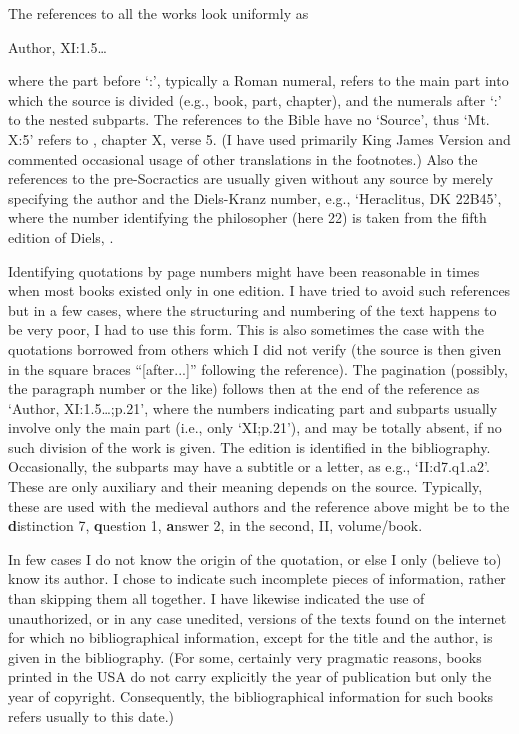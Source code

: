 The references to all the works look uniformly as
\begin{center}
  Author,  XI:1.5\ldots
\end{center}  
where the part before `:', typically a Roman numeral, refers to the main part
into which the source is divided (e.g., book, part, chapter), and the numerals
after `:' to the nested subparts.  The references to the Bible have no `Source',
thus `Mt. X:5' refers to , chapter X, verse 5. 
(I have used primarily King James Version and commented occasional usage of
other translations in the footnotes.) 
Also the references to the pre-Socractics are usually given without any source by
merely specifying the author and the Diels-Kranz number, e.g., `Heraclitus, DK
22B45', where the number identifying the philosopher (here 22) is taken from the
fifth edition of Diels, .

Identifying quotations by page numbers might have been reasonable in times when
most books existed only in one edition.  I have tried to avoid such references
but in a few cases, where the structuring and numbering of the text happens to
be very poor, I had to use this form. This is also sometimes the case with the
quotations borrowed from others which I did not verify (the source is then given
in the square braces ``[after...]'' following the reference).  The pagination
(possibly, the paragraph number or the like) 
follows then at the end of the reference as `Author, 
XI:1.5\ldots;p.21', where the numbers indicating part and subparts usually
involve only the main part (i.e., only `XI;p.21'), and may be totally absent, if
no such division of the work is given.  The edition is identified in the
bibliography.  Occasionally, the subparts may have a subtitle or a letter, as e.g.,
`II:d7.q1.a2'. These are only auxiliary and their meaning depends on the source.
Typically, these are used with the medieval authors and the reference above
might be to the {\bf d}istinction 7, {\bf q}uestion 1, {\bf a}nswer 2, in the
second, II, volume/book.

In few cases I do not know the origin of the quotation, or else I only (believe
to) know its author. I chose to indicate such incomplete pieces of information,
rather than skipping them all together. I have likewise indicated the use of
unauthorized, or in any case unedited, versions of the texts found on the
internet for which no bibliographical information, except for the title and the
author, is given in the bibliography. (For some, certainly very pragmatic reasons,
books printed in the USA do not carry explicitly the year of publication but only
the year of copyright. Consequently, the bibliographical information for such
books refers usually to this date.)

